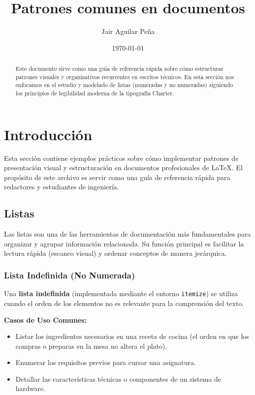 \documentclass[11pt, a4paper]{article}
\title{\textbf{\color{primary}Patrones comunes en documentos}}
\author{Jair Aguilar Peña}
\date{\today}
\begin{document}
\maketitle

\begin{abstract}
Este documento sirve como una guía de referencia rápida sobre cómo estructurar patrones visuales y organizativos recurrentes en escritos técnicos. En esta sección nos enfocamos en el estudio y modelado de listas (numeradas y no numeradas) siguiendo los principios de legibilidad moderna de la tipografía Charter.
\end{abstract}

\section{Introducción}
Esta sección contiene ejemplos prácticos sobre cómo implementar patrones de presentación visual y estructuración en documentos profesionales de \LaTeX. El propósito de este archivo es servir como una guía de referencia rápida para redactores y estudiantes de ingeniería.

\subsection{Listas}
Las listas son una de las herramientas de documentación más fundamentales para organizar y agrupar información relacionada. Su función principal es facilitar la lectura rápida (escaneo visual) y ordenar conceptos de manera jerárquica.

\subsubsection{Lista Indefinida (No Numerada)}
Una \textbf{lista indefinida} (implementada mediante el entorno \texttt{itemize}) se utiliza cuando el orden de los elementos no es relevante para la comprensión del texto. 

\vspace{0.3cm}
\noindent\textbf{Casos de Uso Comunes:}
\begin{itemize}
    \item Listar los ingredientes necesarios en una receta de cocina (el orden en que los compras o preparas en la mesa no altera el plato).
    \item Enumerar los requisitos previos para cursar una asignatura.
    \item Detallar las características técnicas o componentes de un sistema de hardware.
\end{itemize}
\end{document}
